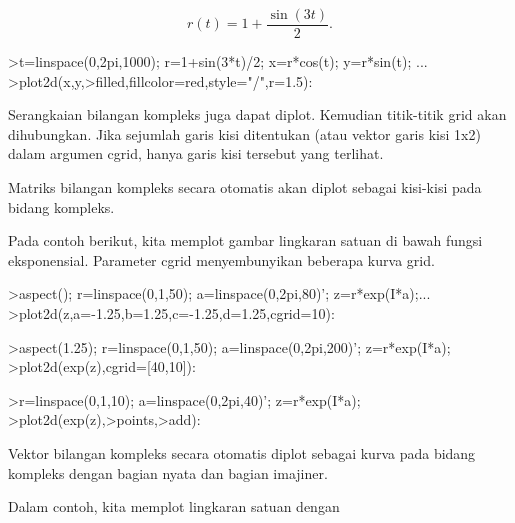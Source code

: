 \documentclass[a4paper,10pt]{article}
\begin{document}
\begin{eulernotebook}
\begin{eulercomment}
\begin{eulercomment}
\begin{eulercomment}
\begin{eulercomment}
\begin{eulercomment}
\begin{eulercomment}
\begin{eulercomment}
\begin{eulercomment}
\begin{eulercomment}
\end{eulercomment}
\begin{eulerformula}
\[
r(t) = 1 + \dfrac{\sin(3t)}{2}.
\]
\end{eulerformula}
\begin{eulerprompt}
>t=linspace(0,2pi,1000); r=1+sin(3*t)/2; x=r*cos(t); y=r*sin(t); ...
>plot2d(x,y,>filled,fillcolor=red,style="/",r=1.5):
\end{eulerprompt}
\begin{eulercomment}
Serangkaian bilangan kompleks juga dapat diplot. Kemudian titik-titik
grid akan dihubungkan. Jika sejumlah garis kisi ditentukan (atau
vektor garis kisi 1x2) dalam argumen cgrid, hanya garis kisi tersebut
yang terlihat.

Matriks bilangan kompleks secara otomatis akan diplot sebagai
kisi-kisi pada bidang kompleks.

Pada contoh berikut, kita memplot gambar lingkaran satuan di bawah
fungsi eksponensial. Parameter cgrid menyembunyikan beberapa kurva
grid.
\end{eulercomment}
\begin{eulerprompt}
>aspect(); r=linspace(0,1,50); a=linspace(0,2pi,80)'; z=r*exp(I*a);...
>plot2d(z,a=-1.25,b=1.25,c=-1.25,d=1.25,cgrid=10):
\end{eulerprompt}
\begin{eulerprompt}
>aspect(1.25); r=linspace(0,1,50); a=linspace(0,2pi,200)'; z=r*exp(I*a);
>plot2d(exp(z),cgrid=[40,10]):
\end{eulerprompt}
\begin{eulerprompt}
>r=linspace(0,1,10); a=linspace(0,2pi,40)'; z=r*exp(I*a);
>plot2d(exp(z),>points,>add):
\end{eulerprompt}
\begin{eulercomment}
Vektor bilangan kompleks secara otomatis diplot sebagai kurva pada
bidang kompleks dengan bagian nyata dan bagian imajiner.

Dalam contoh, kita memplot lingkaran satuan dengan


\end{eulercomment}
\end{eulercomment}
\end{eulercomment}
\end{eulercomment}
\end{eulercomment}
\end{eulercomment}
\end{eulercomment}
\end{eulercomment}
\end{eulercomment}
\end{eulernotebook}
\end{document}
